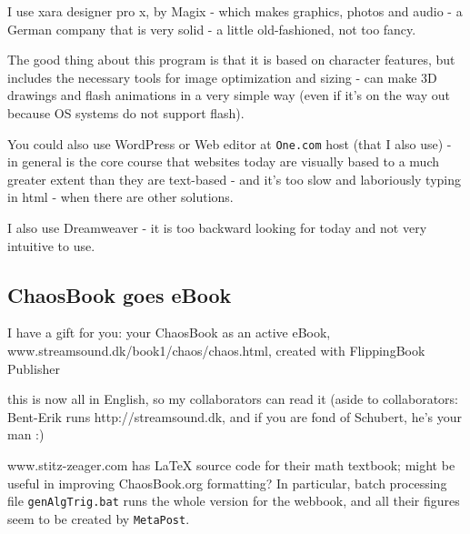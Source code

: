 I use  {xara designer pro x}, by
 {Magix} - which makes graphics, photos
and audio - a German company that is very solid - a little old-fashioned,
not too fancy.

The good thing about this program is that it is based on character
features, but includes the necessary tools for image optimization and
sizing - can make 3D drawings and flash animations in a very simple way
(even if it's on the way out because OS systems do not support flash).

You could also use WordPress or Web editor at \texttt{One.com} host (that
I also use) - in general is the core course that websites today are
visually based to a much greater extent than they are text-based - and
it's too slow and laboriously typing in html - when there are other
solutions.

I also use Dreamweaver - it is too backward looking for today and not
very intuitive to use.

\subsection{ChaosBook goes eBook}
\begin{description}

                                        \toCB
\item[2013-07-29 Bent-Erik]
I have a gift for you: your ChaosBook as an active eBook,
{www.streamsound.dk/book1/chaos/chaos.html},
created with  {FlippingBook Publisher}

\item[2013-08-09 Predrag to Bent-Erik] this is now all in English, so my
collaborators can read it (aside to collaborators: Bent-Erik runs
 {http://streamsound.dk}, and if you are fond
of Schubert, he's  {your
man} :)

\item[2013-08-12 Predrag]
{www.stitz-zeager.com} has LaTeX source code for their math textbook;
might be useful in improving ChaosBook.org formatting? In particular,
batch processing file \texttt{genAlgTrig.bat} runs the whole version
for the webbook, and all their figures seem to be created by
\texttt{MetaPost}.

\item[2013-07-29 Bent-Erik]

\end{description}

